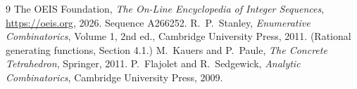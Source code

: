 \documentclass[11pt,a4paper]{article}
\theoremstyle{plain}
\theoremstyle{definition}
\begin{document}
\begin{thebibliography}{9}
 The OEIS Foundation, \emph{The On-Line Encyclopedia of Integer
Sequences}, \url{https://oeis.org}, 2026. Sequence A266252.
 R.~P.~Stanley, \emph{Enumerative Combinatorics}, Volume 1, 2nd ed.,
Cambridge University Press, 2011. (Rational generating functions, Section 4.1.)
 M.~Kauers and P.~Paule, \emph{The Concrete Tetrahedron}, Springer, 2011.
 P.~Flajolet and R.~Sedgewick, \emph{Analytic Combinatorics}, Cambridge
University Press, 2009.
\end{thebibliography}
\end{document}
